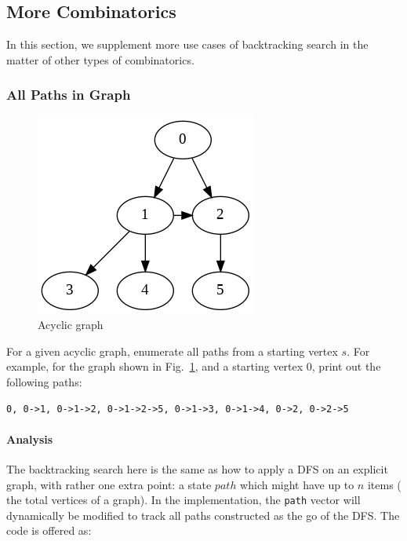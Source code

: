 \documentclass[../main.tex]{subfiles}
\begin{document}
\subsection{More Combinatorics}
In this section, we supplement more use cases of backtracking search in the matter of other types of combinatorics. 
\subsubsection{All Paths in Graph}
\begin{figure}[ht!]
    \centering
    \includegraphics[width=0.4\columnwidth]{fig/all_path_demo.png}
    \caption{Acyclic graph}
    \label{fig:my_label}
\end{figure} 
For a given acyclic graph, enumerate all paths from a starting vertex $s$. For example, for the graph shown in Fig.~\ref{fig:my_label}, and a starting vertex $0$, print out the following paths:
\begin{lstlisting}[numbers=none]
0, 0->1, 0->1->2, 0->1->2->5, 0->1->3, 0->1->4, 0->2, 0->2->5
\end{lstlisting}
\paragraph{Analysis} The backtracking search here is the same as how to apply a DFS on an explicit graph, with rather one extra point: a state $path$ which might have up to $n$ items ( the total vertices of a graph). In the implementation, the \texttt{path} vector will dynamically be modified to track all paths constructed as the go of the DFS. The code is offered as:
\end{document}
